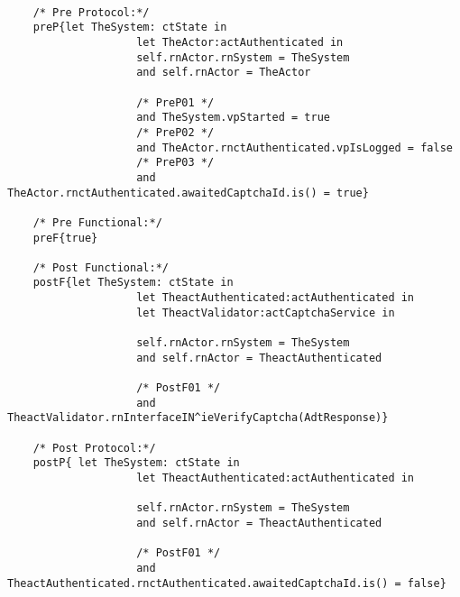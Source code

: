 	\scriptsize
	\vspace{0.5cm}
	\begin{lstlisting}[style=MessirStyle,firstnumber=auto,captionpos=b,caption={\msrmessir (MCL-oriented) specification of the operation \emph{oeSubmitCaptcha}.},label=OM-actAuthenticated-oeSubmitCaptcha-MCL-LST]

	/* Pre Protocol:*/ 
	preP{let TheSystem: ctState in
					let TheActor:actAuthenticated in
					self.rnActor.rnSystem = TheSystem
					and self.rnActor = TheActor
	  
					/* PreP01 */
					and TheSystem.vpStarted = true
					/* PreP02 */
					and TheActor.rnctAuthenticated.vpIsLogged = false
					/* PreP03 */
					and TheActor.rnctAuthenticated.awaitedCaptchaId.is() = true}
	
	/* Pre Functional:*/
	preF{true}
	
	/* Post Functional:*/ 
	postF{let TheSystem: ctState in
					let TheactAuthenticated:actAuthenticated in
					let TheactValidator:actCaptchaService in
	  
					self.rnActor.rnSystem = TheSystem
					and self.rnActor = TheactAuthenticated
					
					/* PostF01 */
					and TheactValidator.rnInterfaceIN^ieVerifyCaptcha(AdtResponse)}
	
	/* Post Protocol:*/ 
	postP{ let TheSystem: ctState in
					let TheactAuthenticated:actAuthenticated in
	  
					self.rnActor.rnSystem = TheSystem
					and self.rnActor = TheactAuthenticated
					
					/* PostF01 */
					and TheactAuthenticated.rnctAuthenticated.awaitedCaptchaId.is() = false}
	
	\end{lstlisting}
	\normalsize 
	
	
	
	





